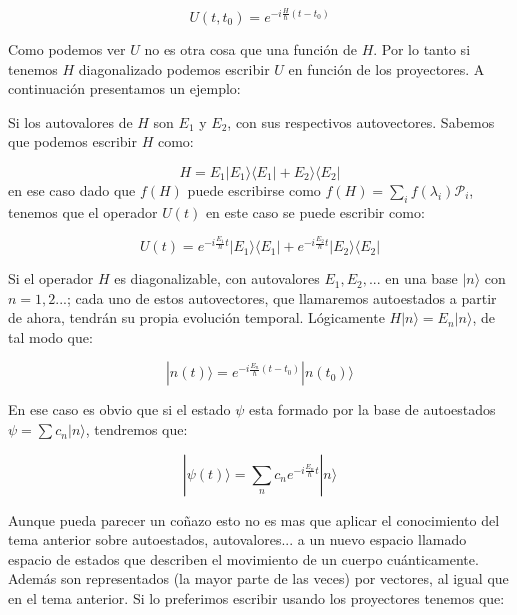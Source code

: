 \documentclass[12pt]{book}
\numberwithin{equation}{chapter}
\numberwithin{figure}{chapter}
\begin{document}
\begin{equation}
U(t,t_0) = e^{- i \frac{H}{\hbar} (t-t_0 ) } 
\end{equation}

Como podemos ver $U$ no es otra cosa que una función de $H$. Por lo tanto si tenemos $H$ diagonalizado podemos escribir $U$ en función de los proyectores. A continuación presentamos un ejemplo: \\


\hrulefill

Si los autovalores de $H$ son $E_1$ y $E_2$, con sus respectivos autovectores. Sabemos que podemos escribir $H$ como:

\begin{equation}
H = E_1 | E_1 \rangle \langle E_1 | +  E_2  \rangle \langle E_2 |
\end{equation}
en ese caso dado que $f(H)$ puede escribirse como $f(H)= \sum_i f(\lambda_i) \mathcal{P}_i$, tenemos que el operador $U(t)$ en este caso se puede escribir como:

\begin{equation}
U(t)=e^{- i \frac{E_1}{\hbar} t}  | E_1 \rangle \langle E_1 | + e^{- i \frac{E_2}{\hbar} t} | E_2 \rangle \langle E_2 |
\end{equation}

\hrulefill

Si el operador $H$ es diagonalizable, con autovalores $E_1,E_2,...$ en una base $|n \rangle$ con $n=1,2...$; cada uno de estos autovectores, que llamaremos autoestados a partir de ahora, tendrán su propia evolución temporal. Lógicamente $H |n\rangle = E_n | n \rangle $, de tal modo que:

\begin{equation}
| n  (t) \rangle =e^{- i \frac{E_n}{\hbar} (t-t_0 )} |n (t_0) \rangle
\end{equation}

En ese caso es obvio que si el estado $\psi$ esta formado por la base de autoestados $\psi = \sum c_n |n\rangle$, tendremos que:

\begin{equation}
| \psi (t) \rangle = \sum_n c_n e^{-i \frac{E_n}{\hbar} t } | n \rangle
\end{equation}

Aunque pueda parecer un coñazo esto no es mas que aplicar el conocimiento del tema anterior sobre autoestados, autovalores... a un nuevo espacio llamado espacio de estados que describen el movimiento de un cuerpo cuánticamente. Además son representados (la mayor parte de las veces) por  vectores, al igual que en el tema anterior. Si lo preferimos escribir usando los proyectores tenemos que:
\end{document}
